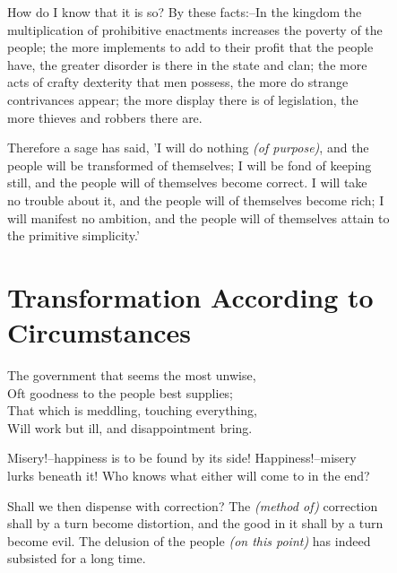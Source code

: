     How do I know that it is so? By these facts:--In the kingdom the\\
    multiplication of prohibitive enactments increases the poverty of the\\
    people; the more implements to add to their profit that the people\\
    have, the greater disorder is there in the state and clan; the more\\
    acts of crafty dexterity that men possess, the more do strange\\
    contrivances appear; the more display there is of legislation, the\\
    more thieves and robbers there are.\vspace{\baselineskip}
    
    Therefore a sage has said, 'I will do nothing \textit{(of purpose)}, and the\\
    people will be transformed of themselves; I will be fond of keeping\\
    still, and the people will of themselves become correct. I will take\\
    no trouble about it, and the people will of themselves become rich; I\\
    will manifest no ambition, and the people will of themselves attain to\\
    the primitive simplicity.'\vspace{\baselineskip}

\section*{Transformation According to Circumstances}
    The government that seems the most unwise,\\
    Oft goodness to the people best supplies;\\
    That which is meddling, touching everything,\\
    Will work but ill, and disappointment bring.\vspace{\baselineskip}
    
    Misery!--happiness is to be found by its side! Happiness!--misery\\
    lurks beneath it! Who knows what either will come to in the end?\vspace{\baselineskip}
    
    Shall we then dispense with correction? The \textit{(method of)} correction\\
    shall by a turn become distortion, and the good in it shall by a turn\\
    become evil. The delusion of the people \textit{(on this point)} has indeed\\
    subsisted for a long time.\vspace{\baselineskip}
    
